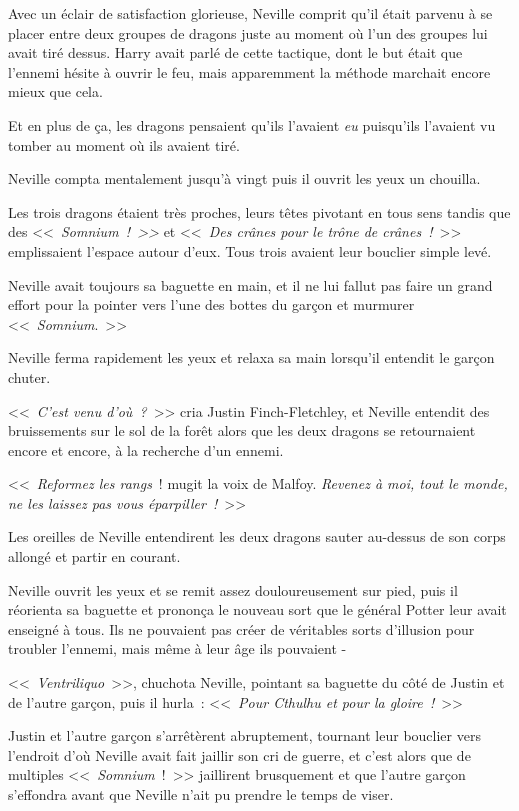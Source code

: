 Avec un éclair de satisfaction glorieuse, Neville comprit qu'il était parvenu à se placer entre deux groupes de dragons juste au moment où l'un des groupes lui avait tiré dessus. Harry avait parlé de cette tactique, dont le but était que l'ennemi hésite à ouvrir le feu, mais apparemment la méthode marchait encore mieux que cela.

Et en plus de ça, les dragons pensaient qu'ils l'avaient \emph{eu} puisqu'ils l'avaient vu tomber au moment où ils avaient tiré.

Neville compta mentalement jusqu'à vingt puis il ouvrit les yeux un chouilla.

Les trois dragons étaient très proches, leurs têtes pivotant en tous sens tandis que des <<~\emph{Somnium~!~>>} et <<~\emph{Des crânes pour le trône de crânes~!}~>> emplissaient l'espace autour d'eux. Tous trois avaient leur bouclier simple levé.

Neville avait toujours sa baguette en main, et il ne lui fallut pas faire un grand effort pour la pointer vers l'une des bottes du garçon et murmurer <<~\emph{Somnium}.~>>

Neville ferma rapidement les yeux et relaxa sa main lorsqu'il entendit le garçon chuter.

<<~\emph{C'est venu d'où~?}~>> cria Justin Finch-Fletchley, et Neville entendit des bruissements sur le sol de la forêt alors que les deux dragons se retournaient encore et encore, à la recherche d'un ennemi.

<<~\emph{Reformez les rangs}~! mugit la voix de Malfoy. \emph{Revenez à moi, tout le monde, ne les laissez pas vous éparpiller~!}~>>

Les oreilles de Neville entendirent les deux dragons sauter au-dessus de son corps allongé et partir en courant.

Neville ouvrit les yeux et se remit assez douloureusement sur pied, puis il réorienta sa baguette et prononça le nouveau sort que le général Potter leur avait enseigné à tous. Ils ne pouvaient pas créer de véritables sorts d'illusion pour troubler l'ennemi, mais même à leur âge ils pouvaient -

<<~\emph{Ventriliquo}~>>, chuchota Neville, pointant sa baguette du côté de Justin et de l'autre garçon, puis il hurla~: <<~\emph{Pour Cthulhu et pour la gloire~!}~>>

Justin et l'autre garçon s'arrêtèrent abruptement, tournant leur bouclier vers l'endroit d'où Neville avait fait jaillir son cri de guerre, et c'est alors que de multiples <<~\emph{Somnium}~!~>> jaillirent brusquement et que l'autre garçon s'effondra avant que Neville n'ait pu prendre le temps de viser.

